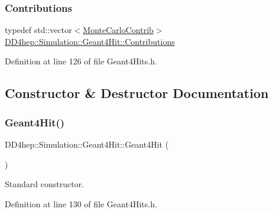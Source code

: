 \subsubsection{\texorpdfstring{Contributions}{Contributions}}
{\footnotesize\ttfamily typedef std\+::vector$<$\hyperlink{struct_d_d4hep_1_1_simulation_1_1_geant4_hit_1_1_monte_carlo_contrib}{Monte\+Carlo\+Contrib}$>$ \hyperlink{class_d_d4hep_1_1_simulation_1_1_geant4_hit_acdc278ce7e641d337b024d5fc8f52a2c}{D\+D4hep\+::\+Simulation\+::\+Geant4\+Hit\+::\+Contributions}}



Definition at line 126 of file Geant4\+Hits.\+h.



\subsection{Constructor \& Destructor Documentation}
\hypertarget{class_d_d4hep_1_1_simulation_1_1_geant4_hit_a45eca144a88d313ce22aeaff75dedce1}{}\label{class_d_d4hep_1_1_simulation_1_1_geant4_hit_a45eca144a88d313ce22aeaff75dedce1} 
\subsubsection{\texorpdfstring{Geant4\+Hit()}{Geant4Hit()}}
{\footnotesize\ttfamily D\+D4hep\+::\+Simulation\+::\+Geant4\+Hit\+::\+Geant4\+Hit (\begin{DoxyParamCaption}{ }\end{DoxyParamCaption})\hspace{0.3cm}{\ttfamily [inline]}}



Standard constructor. 



Definition at line 130 of file Geant4\+Hits.\+h.

\hypertarget{class_d_d4hep_1_1_simulation_1_1_geant4_hit_a26ed0cb1e754012a586523a107e9bc7c}{}\label{class_d_d4hep_1_1_simulation_1_1_geant4_hit_a26ed0cb1e754012a586523a107e9bc7c} 
